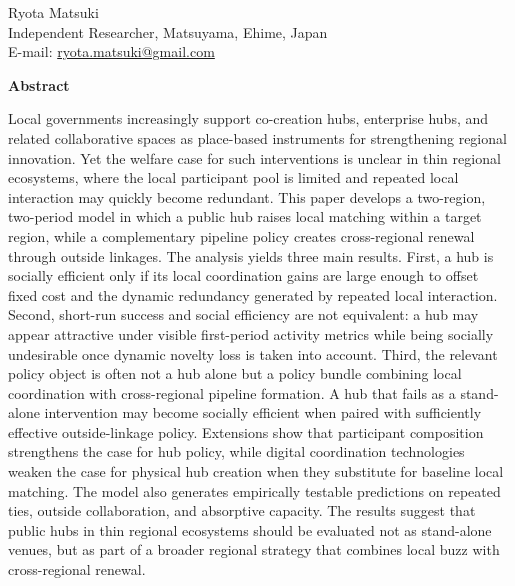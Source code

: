 \documentclass[12pt]{article}
\title{\papertitle}
\author{}
\date{}
\makeatletter
\newif\ifblind
\theoremstyle{plain}
\theoremstyle{remark}
\newcommand{\authorname}{Ryota Matsuki}
\newcommand{\authoraffil}{Independent Researcher, Matsuyama, Ehime, Japan}
\newcommand{\authoremail}{ryota.matsuki@gmail.com}
\makeatother
\begin{document}
\maketitle
\thispagestyle{plain}

\ifblind
\begin{center}
\normalsize
\emph{Author information omitted for double-blind review.}
\end{center}
\vspace{0.6em}
\else
\begin{center}
\normalsize
\authorname\\
\authoraffil\\
E-mail: \href{mailto:\authoremail}{\authoremail}
\end{center}
\vspace{0.6em}
\fi

\noindent\textbf{Abstract}

\noindent
Local governments increasingly support co-creation hubs, enterprise hubs, and related collaborative spaces as place-based instruments for strengthening regional innovation. Yet the welfare case for such interventions is unclear in thin regional ecosystems, where the local participant pool is limited and repeated local interaction may quickly become redundant. This paper develops a two-region, two-period model in which a public hub raises local matching within a target region, while a complementary pipeline policy creates cross-regional renewal through outside linkages. The analysis yields three main results. First, a hub is socially efficient only if its local coordination gains are large enough to offset fixed cost and the dynamic redundancy generated by repeated local interaction. Second, short-run success and social efficiency are not equivalent: a hub may appear attractive under visible first-period activity metrics while being socially undesirable once dynamic novelty loss is taken into account. Third, the relevant policy object is often not a hub alone but a policy bundle combining local coordination with cross-regional pipeline formation. A hub that fails as a stand-alone intervention may become socially efficient when paired with sufficiently effective outside-linkage policy. Extensions show that participant composition strengthens the case for hub policy, while digital coordination technologies weaken the case for physical hub creation when they substitute for baseline local matching. The model also generates empirically testable predictions on repeated ties, outside collaboration, and absorptive capacity. The results suggest that public hubs in thin regional ecosystems should be evaluated not as stand-alone venues, but as part of a broader regional strategy that combines local buzz with cross-regional renewal.
\end{document}

